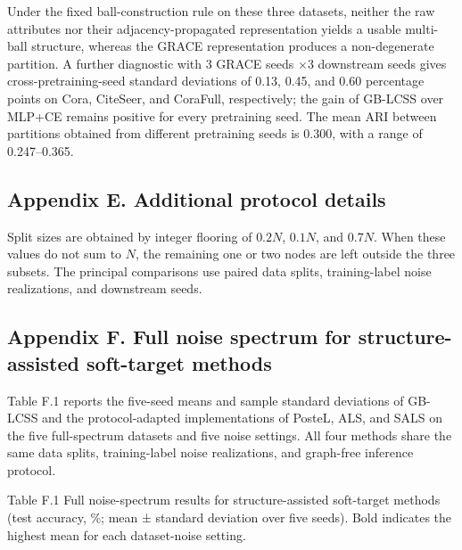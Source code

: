 Under the fixed ball-construction rule on these three datasets, neither the raw attributes nor their adjacency-propagated representation yields a usable multi-ball structure, whereas the GRACE representation produces a non-degenerate partition. A further diagnostic with \(3\) GRACE seeds \(\times 3\) downstream seeds gives cross-pretraining-seed standard deviations of 0.13, 0.45, and 0.60 percentage points on Cora, CiteSeer, and CoraFull, respectively; the gain of GB-LCSS over MLP+CE remains positive for every pretraining seed. The mean ARI between partitions obtained from different pretraining seeds is 0.300, with a range of 0.247--0.365.

\subsection{Appendix E. Additional protocol details}\label{appendix-e.-additional-protocol-details}

Split sizes are obtained by integer flooring of \(0.2N\), \(0.1N\), and \(0.7N\). When these values do not sum to \(N\), the remaining one or two nodes are left outside the three subsets. The principal comparisons use paired data splits, training-label noise realizations, and downstream seeds.

\subsection{Appendix F. Full noise spectrum for structure-assisted soft-target methods}\label{appendix-f.-full-noise-spectrum-for-structure-assisted-soft-target-methods}

Table F.1 reports the five-seed means and sample standard deviations of GB-LCSS and the protocol-adapted implementations of PosteL, ALS, and SALS on the five full-spectrum datasets and five noise settings. All four methods share the same data splits, training-label noise realizations, and graph-free inference protocol.

Table F.1 Full noise-spectrum results for structure-assisted soft-target methods (test accuracy, \%; mean ± standard deviation over five seeds). Bold indicates the highest mean for each dataset-noise setting.

